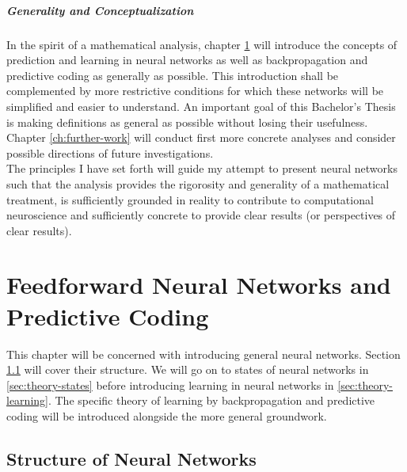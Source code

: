 \documentclass[a4paper,11pt]{report}
\begin{document}
\paragraph{Generality and Conceptualization}
In the spirit of a mathematical analysis, chapter \ref{ch:theory} will introduce the concepts of prediction and learning in neural networks as well as backpropagation and predictive coding as generally as possible. This introduction shall be complemented by more restrictive conditions for which these networks will be simplified and easier to understand. An important goal of this Bachelor's Thesis is making definitions as general as possible  without losing their usefulness. Chapter \ref{ch:further-work} will conduct first more concrete analyses and consider possible directions of future investigations.\\
The principles I have set forth will guide my attempt to present neural networks such that the analysis provides the rigorosity and generality of a mathematical treatment, is sufficiently grounded in reality to contribute to computational neuroscience and sufficiently concrete to provide clear results (or perspectives of clear results).


\chapter{Feedforward Neural Networks and Predictive Coding}\label{ch:theory}

This chapter will be concerned with introducing general neural networks. Section \ref{sec:theory-structure} will cover their structure. We will go on to states of neural networks in \ref{sec:theory-states} before introducing learning in neural networks in \ref{sec:theory-learning}. The specific theory of learning by backpropagation and predictive coding will be introduced alongside the more general groundwork.

\section{Structure of Neural Networks}\label{sec:theory-structure}
\end{document}
